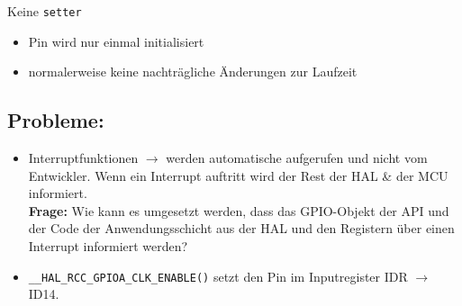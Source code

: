 Keine \texttt{setter}
\begin{itemize}
	\item Pin wird nur einmal initialisiert
	\item normalerweise keine nachträgliche Änderungen zur Laufzeit
\end{itemize}

\subsection*{Probleme:}
\begin{itemize}
	\item Interruptfunktionen $\rightarrow$ werden automatische aufgerufen und nicht vom Entwickler. Wenn ein Interrupt auftritt wird der Rest der HAL \& der MCU informiert.\\ \textbf{Frage:} Wie kann es umgesetzt werden, dass das GPIO-Objekt der API und der Code der Anwendungsschicht aus der HAL und den Registern über einen Interrupt informiert werden?
	\item \texttt{\_\_HAL\_RCC\_GPIOA\_CLK\_ENABLE()} setzt den Pin im Inputregister IDR $\rightarrow$ ID14.
	
\end{itemize}

